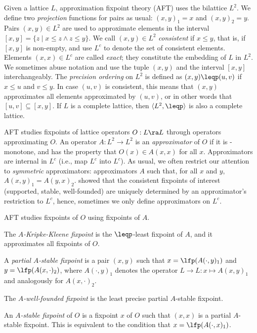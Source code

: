 {Given a lattice $L$, approximation fixpoint theory (AFT) uses the bilattice 
$L^2$.  We define two \emph{projection} functions for pairs as usual:
$(x,y)_1=x$ and $(x,y)_2=y$.  Pairs $(x,y)\in L^2$ are used to
approximate elements in the interval $[x,y] = \{z\mid x\leq
z\wedge z\leq y\}$. We call $(x,y)\in L^2$ \emph{consistent} if $x\leq 
y$, that is, if $[x,y]$ is non-empty, and use $L^c$ to denote the set
of consistent elements. Elements $(x,x) \in L^c$ are called
\emph{exact}; they constitute the embedding of $L$ in $L^2$.  We sometimes abuse notation and use the tuple $(x,y)$
and the interval $[x,y]$ interchangeably.  The \emph{precision
  ordering} on $L^2$ is defined as $(x,y) \leqp (u,v)$ if $x\leq u$
and $v\leq y$. In case $(u,v)$ is consistent, this means that $(x,y)$
approximates all elements approximated by $(u,v)$, or in other words
that $[u,v]\subseteq [x,y]$.  If $L$ is a complete lattice, then
$\langle L^2,\leqp\rangle$ is also a complete lattice.
  


AFT studies fixpoints of lattice operators $O:L\ra L$ through operators approximating $O$.
 An operator $A: L^2\to L^2$  is an \emph{approximator} of $O$ if it is \leqp-monotone,  and has the property that $O(x)\in A(x,x)$ for all $x$. %
Approximators are
internal in $L^c$ (i.e., map $L^c$ into $L^c$).
As usual, we often restrict our attention to \emph{symmetric} approximators: approximators $A$ such that, for all $x$ and $y$, $A(x,y)_1 = A(y,x)_2$. %
\citet{DeneckerMT04} showed that the consistent fixpoints of interest (supported, stable, well-founded) are uniquely determined by an approximator's restriction to $L^c$, hence, sometimes we only define approximators on $L^c$. 

AFT studies fixpoints of $O$ using fixpoints of $A$. 
 \begin{compactitem}
  \item The \emph{$A$-Kripke-Kleene fixpoint} is the $\leqp$-least fixpoint of $A$, and it approximates all fixpoints of $O$. 
\item A \emph{partial $A$-stable fixpoint} is a pair  $(x,y)$ such that $x=\lfp(A(\cdot,y)_1)$ and $y=\lfp(A(x,\cdot)_2)$, where $A(\cdot,y)_1$ denotes the operator $L\to L:x\mapsto A(x,y)_1$ and analogously for $A(x,\cdot)_2$. 
\item The \emph{$A$-well-founded fixpoint} is the least precise partial $A$-stable fixpoint. 
\item  An \emph{$A$-stable fixpoint} of $O$ is a fixpoint $x$ of $O$ such that $(x,x)$ is a partial $A$-stable fixpoint. This is equivalent to the condition that $x=\lfp(A(\cdot, x)_1)$.
 \end{compactitem}

}
